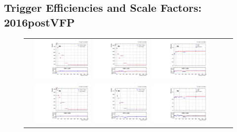 \clearpage
\subsection{Trigger Efficiencies and Scale Factors: 2016postVFP}
\label{TrigSFResults2016postVFP}

\begin{figure}[htb]
  \begin{center}
    \begin{tabular}{ccc}
      \includegraphics[width=0.30\textwidth]{fig_2016postVFP_TrigSF/g_lepApt_emu_MC.pdf}
      \includegraphics[width=0.30\textwidth]{fig_2016postVFP_TrigSF/g_lepApt_emu_data.pdf}
      \includegraphics[width=0.30\textwidth]{fig_2016postVFP_TrigSF/g_emu_lepApt_FullSystUncBand.pdf}\\
      \includegraphics[width=0.30\textwidth]{fig_2016postVFP_TrigSF/g_lepBpt_emu_MC.pdf}
      \includegraphics[width=0.30\textwidth]{fig_2016postVFP_TrigSF/g_lepBpt_emu_data.pdf}
      \includegraphics[width=0.30\textwidth]{fig_2016postVFP_TrigSF/g_emu_lepBpt_FullSystUncBand.pdf}\\

\end{tabular}
\end{center}
\end{figure}

